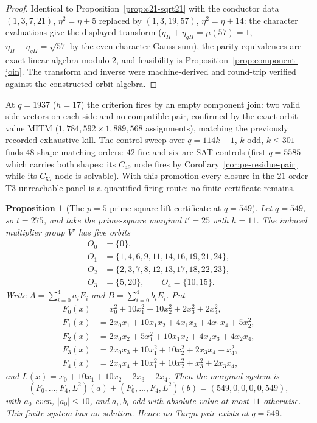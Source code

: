 \documentclass[11pt]{article}
\theoremstyle{plain}
\newtheorem{proposition}[theorem]{Proposition}
\theoremstyle{definition}
\theoremstyle{remark}
\begin{document}
\begin{proof}
Identical to Proposition~\ref{prop:c21-sqrt21} with the conductor data
$(1,3,7,21)$, $\eta^2=\eta+5$ replaced by $(1,3,19,57)$,
$\eta^2=\eta+14$: the character evaluations give the displayed
transform ($\eta_H+\eta_{gH}=\mu(57)=1$,
$\eta_H-\eta_{gH}=\sqrt{57}$ by the even-character Gauss sum), the
parity equivalences are exact linear algebra modulo $2$, and
feasibility is Proposition~\ref{prop:component-join}.  The transform
and inverse were machine-derived and round-trip verified against the
constructed orbit algebra.
\end{proof}

At $q=1937$ ($h=17$) the criterion fires by an empty component join:
two valid side vectors on each side and no compatible pair, confirmed
by the exact orbit-value MITM ($1{,}784{,}592\times1{,}889{,}568$
assignments), matching the previously recorded exhaustive kill.  The
control sweep over $q=114k-1$, $k$ odd, $k\le301$ finds $48$
shape-matching orders: $42$ fire and six are SAT controls (first
$q=5585$ --- which carries both shapes: its $C_{49}$ node fires by
Corollary~\ref{cor:pe-residue-pair} while its $C_{57}$ node is
solvable).  With this promotion every closure in the $21$-order
T3-unreachable panel is a quantified firing route: no finite
certificate remains.

\begin{proposition}[The $p=5$ prime-square lift certificate at
\texorpdfstring{$q=549$}{q=549}]\label{prop:q549-fiveorbit}
Let $q=549$, so $t=275$, and take the prime-square marginal $t'=25$ with
$h=11$. The induced multiplier group $V'$ has five orbits
\[
\begin{aligned}
O_0&=\{0\},\\
O_1&=\{1,4,6,9,11,14,16,19,21,24\},\\
O_2&=\{2,3,7,8,12,13,17,18,22,23\},\\
O_3&=\{5,20\},\qquad O_4=\{10,15\}.
\end{aligned}
\]
Write $A=\sum_{i=0}^4 a_iE_i$ and $B=\sum_{i=0}^4 b_iE_i$. Put
\[
\begin{aligned}
F_0(x)&=x_0^2+10x_1^2+10x_2^2+2x_3^2+2x_4^2,\\
F_1(x)&=2x_0x_1+10x_1x_2+4x_1x_3+4x_1x_4+5x_2^2,\\
F_2(x)&=2x_0x_2+5x_1^2+10x_1x_2+4x_2x_3+4x_2x_4,\\
F_3(x)&=2x_0x_3+10x_1^2+10x_2^2+2x_3x_4+x_4^2,\\
F_4(x)&=2x_0x_4+10x_1^2+10x_2^2+x_3^2+2x_3x_4,
\end{aligned}
\]
and $L(x)=x_0+10x_1+10x_2+2x_3+2x_4$. Then the marginal system is
\[
  (F_0,\ldots,F_4,L^2)(a)+(F_0,\ldots,F_4,L^2)(b)
  =(549,0,0,0,0,549),
\]
with $a_0$ even, $|a_0|\le10$, and $a_i,b_i$ odd with absolute value at most
$11$ otherwise. This finite system has no solution. Hence no Turyn pair exists
at $q=549$.
\end{proposition}
\end{document}
